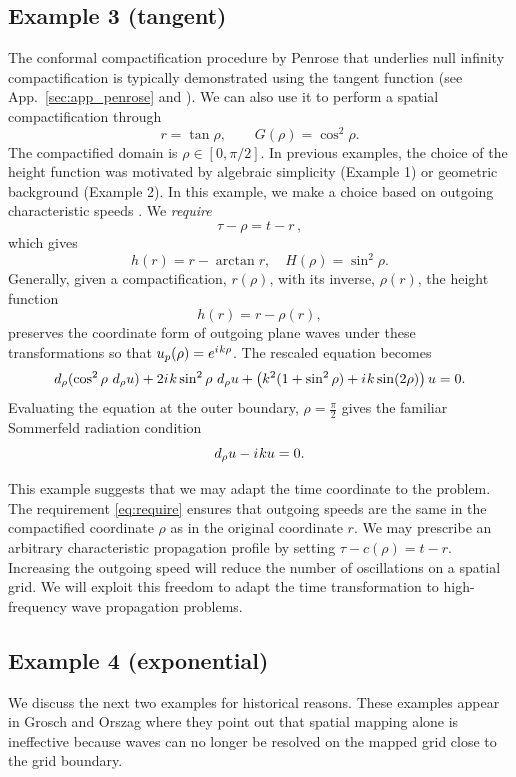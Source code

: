 \documentclass[draft,onefignum,onetabnum]{siamart190516}
\newcommand{\be}{\begin{equation}}
\newcommand{\ee}{\end{equation}}
\newcommand{\iu}{{i\mkern1mu}}
\begin{document}
\subsection{Example 3 (tangent)}
The conformal compactification procedure by Penrose \cite{Penrose, Penrose65} that underlies null infinity compactification is typically demonstrated using the tangent function (see App.~\ref{sec:app_penrose} and \cite{penrose2011republication}). We can also use it to perform a spatial compactification through
\be\label{eq:ex3_mapping} r = \tan \rho, \qquad G(\rho) = \cos^2\rho. \ee
The compactified domain is $\rho\in[0,\pi/2]$. In previous examples, the choice of the height function was motivated by algebraic simplicity (Example 1) or geometric background (Example 2). In this example, we make a choice based on outgoing characteristic speeds \cite{ZENGINOGLU20112286, bernuzzi2011binary}. We \emph{require} 
\be\label{eq:require} \tau - \rho = t - r\,,\ee
which gives
\[ h(r) = r - \arctan r, \quad H(\rho) = \sin^2\rho. \]
Generally, given a compactification, $r(\rho)$, with its inverse, $\rho(r)$, the height function
\be\label{eq:invariant} 
h(r) = r - \rho(r),
\ee 
preserves the coordinate form of outgoing plane waves under these transformations so that $u_p(\rho) = e^{\iu k \rho}$. The rescaled equation becomes
\be\label{eq:transformed} d_\rho(\cos^2 \rho \ d_\rho u ) + 2\iu k \sin^2\rho \ d_\rho u + \left(k^2 (1+\sin^2\rho)+\iu k \sin(2\rho) \right) u = 0. \ee
Evaluating the equation at the outer boundary, $\rho=\frac{\pi}{2}$ gives the familiar Sommerfeld radiation condition
\[ d_\rho u - \iu k u = 0. \]

This example suggests that we may adapt the time coordinate to the problem. The requirement \eqref{eq:require} ensures that outgoing speeds are the same in the compactified coordinate $\rho$ as in the original coordinate $r$. We may prescribe an arbitrary characteristic propagation profile by setting $\tau - c(\rho) = t - r$. Increasing the outgoing speed will reduce the number of oscillations on a spatial grid. We will exploit this freedom to adapt the time transformation to high-frequency wave propagation problems.

\subsection{Example 4 (exponential)}
We discuss the next two examples for historical reasons. These examples appear in Grosch and Orszag \cite{GroschOrszag77} where they point out that spatial mapping alone is ineffective because waves can no longer be resolved on the mapped grid close to the grid boundary. 
\end{document}
